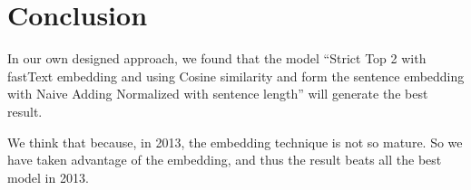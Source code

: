 \section{Conclusion}
\label{sec:conclusion}

In our own designed approach, we found that the model “Strict Top 2 with fastText embedding and using Cosine similarity and form the sentence embedding with Naive Adding Normalized with sentence length” will generate the best result.

We think that because, in 2013, the embedding technique is not so mature. So we have taken advantage of the embedding, and thus the result beats all the best model in 2013.
